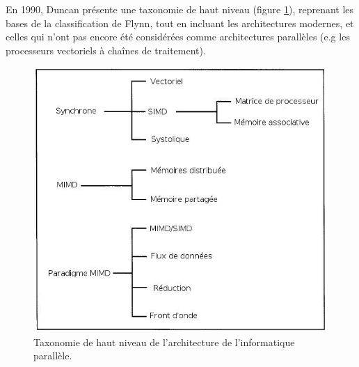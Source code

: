 \documentclass[a4paper,12pt]{report}
\theoremstyle{plain}				%
\theoremstyle{definition}				%
\newcommand{\lp}[1]{\todo[author=LP,color=yellow,inline]{#1}}
\newcommand{\fco}[1]{\todo[author=FCO,color=blue,inline]{#1}}
\begin{document}
En 1990, Duncan présente une taxonomie de haut niveau \cite{44900}
(figure \ref{fig:TaxonomieHautNiveau}),
reprenant les bases de la classification de Flynn, tout en incluant
les architectures modernes, et celles qui n'ont pas encore été
considérées comme architectures parallèles (e.g les processeurs
vectoriels à chaînes de traitement).

\begin{figure}
\includegraphics[width=\columnwidth]{Biblio_PCmax_Rendu_Taxonomie_Duncan.jpg}
\caption{Taxonomie de haut niveau de l'architecture de l'informatique parallèle.}
\label{fig:TaxonomieHautNiveau}
\end{figure}
\end{document}
